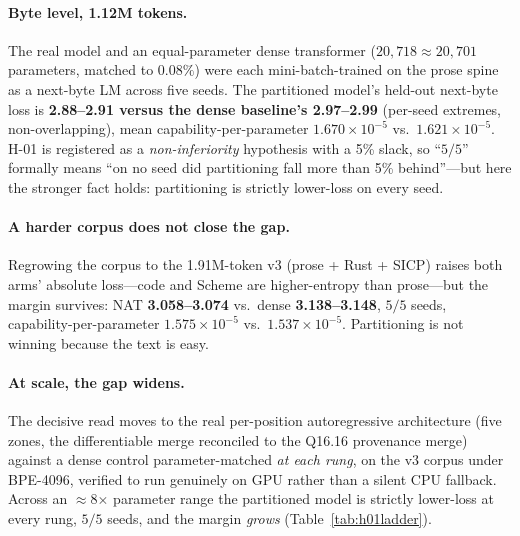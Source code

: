 \documentclass[11pt]{article}
\newcommand{\Qff}{Q16.16}
\begin{document}
\paragraph{Byte level, 1.12M tokens.}
The real model and an equal-parameter dense transformer ($20{,}718 \approx 20{,}701$ parameters,
matched to $0.08\%$) were each mini-batch-trained on the prose spine as a next-byte LM across five
seeds. The partitioned model's held-out next-byte loss is \textbf{2.88--2.91 versus the dense
baseline's 2.97--2.99} (per-seed extremes, non-overlapping), mean capability-per-parameter
$1.670\times10^{-5}$ vs.\ $1.621\times10^{-5}$. H-01 is registered as a \emph{non-inferiority}
hypothesis with a 5\% slack, so ``$5/5$'' formally means ``on no seed did partitioning fall more than
5\% behind''---but here the stronger fact holds: partitioning is strictly lower-loss on every seed.

\paragraph{A harder corpus does not close the gap.}
Regrowing the corpus to the 1.91M-token v3 (prose + Rust + SICP) raises both arms' absolute loss---code
and Scheme are higher-entropy than prose---but the margin survives: NAT \textbf{3.058--3.074} vs.\
dense \textbf{3.138--3.148}, $5/5$ seeds, capability-per-parameter $1.575\times10^{-5}$ vs.\
$1.537\times10^{-5}$. Partitioning is not winning because the text is easy.

\paragraph{At scale, the gap widens.}
The decisive read moves to the real per-position autoregressive architecture (five zones, the
differentiable merge reconciled to the \Qff{} provenance merge) against a dense control
parameter-matched \emph{at each rung}, on the v3 corpus under BPE-4096, verified to run genuinely on
GPU rather than a silent CPU fallback. Across an $\approx$8$\times$ parameter range the partitioned
model is strictly lower-loss at every rung, $5/5$ seeds, and the margin \emph{grows}
(Table~\ref{tab:h01ladder}).
\end{document}
